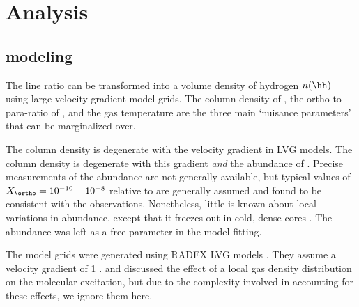 \section{Analysis}
\label{sec:analysis}

\subsection{\formaldehyde modeling}
\label{sec:models}
The \formaldehyde line ratio can be transformed into a volume
density of hydrogen $n(\hh)$ using large velocity gradient model grids.
The column density of \ortho, the ortho-to-para-ratio of \hh, and the gas
temperature are the three main `nuisance parameters' that can be marginalized
over.

The \ortho column density is degenerate with the velocity gradient in LVG
models.  The \hh column density is degenerate with this gradient \emph{and} the
abundance of \ortho.  Precise measurements of the \formaldehyde abundance are
not generally available, but typical values of $X_{\ortho} = 10^{-10}-10^{-8}$
relative to \hh are generally assumed \citep{Mangum1993a, Ginsburg2011a,
Ginsburg2013a, Ao2013a} and found to be consistent with the observations.
Nonetheless, little is known about local variations in \ortho abundance, except
that it freezes out in cold, dense cores \citep{Young2004a}.
The abundance was left as a free parameter in the model fitting.


The model grids were generated using RADEX LVG models
\citep[python wrapper \url{https://github.com/keflavich/pyradex/}; original
code][]{van-Der-Tak2007a}.  They assume a velocity gradient of 1 \kms \perpc.
\citet{Ginsburg2011a} and \citet{Ginsburg2013a} discussed the effect of a local
gas density distribution on the molecular excitation, but due to the complexity
involved in accounting for these effects, we ignore them here.

